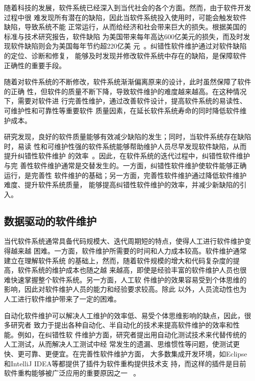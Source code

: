随着科技的发展，软件系统已经深入到当代社会的各个方面。然而，由于软件开发过程中很
难发现所有潜在的缺陷，因此当软件系统投入使用时，可能会触发软件缺陷，导致系统不能
正常运行，从而给经济和社会带来巨大的损失。根据美国的标准与技术研究报告，软件缺陷
为美国带来每年高达600亿美元的损失，而及时发现软件缺陷则会为美国每年节约超220亿美
元~\cite{strate2013literature}。纠错性软件维护通过对软件缺陷的定位、诊断和修复，
能够及时发现并修改软件系统中存在的缺陷，是保障软件正确性的重要手段。

随着对软件系统的不断修改，软件系统渐渐偏离原来的设计，此时虽然保障了软件的正确
性，但软件的质量不断下降，导致软件维护的难度越来越高。在这种情况下，需要对软件进
行完善性维护，通过改善软件设计，提高软件系统的易读性、可维护性和可靠性等重要软件
质量因素，在延长软件系统寿命的同时降低软件维护成本。

研究发现，良好的软件质量能够有效减少缺陷的发生；同时，当软件系统存在缺陷时，易读
性和可维护性强的软件系统能够帮助维护人员尽早发现软件缺陷，从而提升纠错性软件维护
的效率~\cite{martin2009clean}。因此，在软件系统的迭代过程中，纠错性软件维护与完
善性软件维护通常是交替发生的。一方面，纠错性软件维护使软件能够正确运行，是完善性
软件维护的基础；另一方面，完善性软件维护通过降低软件维护难度、提升软件系统质量，
能够提高纠错性软件维护的效率，并减少新缺陷的引入。


\subsection{数据驱动的软件维护}
当代软件系统通常具备代码规模大、迭代周期短的特点，使得人工进行软件维护变得越来越
困难。一方面，软件维护所需要的时间和人力成本较高。软件维护通常建立在理解软件系统
的基础上，然而，随着软件规模的增大和代码复杂度的提高，软件系统的维护成本也随之越
来越高，即使是经验丰富的软件维护人员也很难快速掌握整个软件系统。另一方面，人工软
件维护的效果容易受到个体思维的影响，因此对软件维护人员的能力和经验要求较高。除此
以外，人员流动性也为人工进行软件维护带来了一定的困难。

自动化软件维护可以解决人工维护的效率低、易受个体思维影响的缺点，因此，很多研究者
致力于提出各种自动化、半自动化的技术来提高软件维护的效率和性能。例如，在纠错性软
件维护方面，研究者提出用自动化测试技术来代替传统的人工测试，从而解决人工测试中经
常发生的遗漏、思维惯性等问题，使测试更快、更可靠、更便宜。在完善性软件维护方面，
大多数集成开发环境，如Eclipse和IntelliJ IDEA等都提供了插件为软件重构提供技术支
持，而这样的插件是目前软件重构能够被广泛应用的重要原因之一
~\cite{griswold1993automated,tip2003refactoring,mens2005formalizing}。

